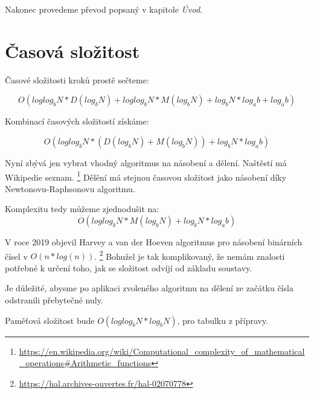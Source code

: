 \documentclass{article}
\begin{document}
Nakonec provedeme převod popsaný v kapitole \emph{Úvod}.

\section*{Časová složitost}

Časové složitosti kroků prostě sečteme:

\begin{equation*}
    O(
    log log_b N * D(log_b N) +
    log log_b N * M(log_b N) +
    log_b N * log_a b +
    log_a b
    )
\end{equation*}

Kombinací časových složitostí získáme:

\begin{equation*}
    O(
    log log_b N * (D(log_b N) + M(log_b N)) +
    log_b N * log_a b
    )
\end{equation*}

Nyní zbývá jen vybrat vhodný algoritmus na násobení a dělení. Naštěstí má Wikipedie seznam.
\footnote{\url{https://en.wikipedia.org/wiki/Computational_complexity_of_mathematical_operations\#Arithmetic_functions}}
Dělění má stejnou časovou složitost jako násobení díky Newtonovu-Raphsonovu algoritmu.

Komplexitu tedy můžeme zjednodušit na:
\begin{equation*}
    O(
    log log_b N * M(log_b N) +
    log_b N * log_a b
    )
\end{equation*}

V roce 2019 objevil Harvey a van der Hoeven algoritmus pro násobení binárních čísel v \(O(n * log(n))\).
\footnote{\url{https://hal.archives-ouvertes.fr/hal-02070778}}
Bohužel je tak komplikovaný, že nemám znalosti potřebné k určení toho, jak se složitost odvíjí od základu soustavy.

Je důležité, abysme po aplikaci zvoleného algoritmu na dělení ze začátku čísla odstranili přebytečné nuly.

Paměťová složitost bude \(O(log log_b N * log_b N)\), pro tabulku z přípravy.
\end{document}
